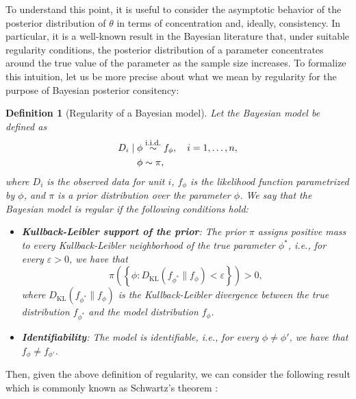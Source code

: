\documentclass[12pt]{article}
\newcommand{\iid}{\overset{\text{\footnotesize i.i.d.}}{\sim}}
\newtheorem{definition}{Definition}
\begin{document}
To understand this point, it is useful to consider the asymptotic behavior of the posterior distribution of \(\theta\) in terms of concentration and, ideally, consistency. In particular, it is a well-known result in the Bayesian literature that, under suitable regularity conditions, the posterior distribution of a parameter concentrates around the true value of the parameter as the sample size increases. To formalize this intuition, let us be more precise about what we mean by regularity for the purpose of Bayesian posterior consitency:
\begin{definition}[Regularity of a Bayesian model]
\label{def:regularity}
  Let the Bayesian model be defined as
  \begin{align}
    \begin{split}
      D_{i} \mid \phi & \iid f_{\phi}, \quad i = 1, \ldots, n, \\
      \phi & \sim \pi,
    \end{split}
  \end{align}
  where \(D_{i}\) is the observed data for unit \(i\), \(f_{\phi}\) is the likelihood function parametrized by \(\phi\), and \(\pi\) is a prior distribution over the parameter \(\phi\). We say that the Bayesian model is regular if the following conditions hold:
  \begin{itemize}
    \item \textbf{Kullback-Leibler support of the prior}: The prior \(\pi\) assigns positive mass to every Kullback-Leibler neighborhood of the true parameter \(\phi^{*}\), i.e., for every \(\varepsilon > 0\), we have that
    \begin{equation}
      \pi \left( \left\{ \phi : D_{\mathrm{KL}}(f_{\phi^{*}} \| f_{\phi}) < \varepsilon \right\} \right) > 0,
    \end{equation}
    where \(D_{\mathrm{KL}}(f_{\phi^{*}} \| f_{\phi})\) is the Kullback-Leibler divergence between the true distribution \(f_{\phi^{*}}\) and the model distribution \(f_{\phi}\).

    \item \textbf{Identifiability}: The model is identifiable, i.e., for every \(\phi \neq \phi'\), we have that \(f_{\phi} \neq f_{\phi'}\).
  \end{itemize}
\end{definition}
Then, given the above definition of regularity, we can consider the following result which is commonly known as Schwartz's theorem \citep{schwartz1965bayes}:
\end{document}
